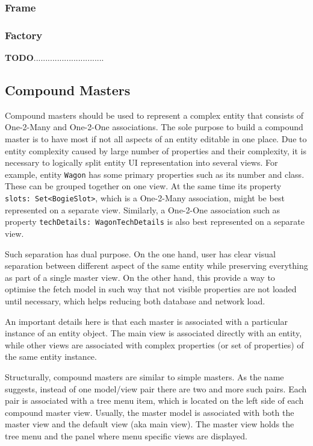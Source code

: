   \subsubsection{Frame}
  
  \subsubsection{Factory}  
  
  
  \textbf{TODO}..............................
  
\subsection{Compound Masters}

  Compound masters should be used to represent a complex entity that consists of One-2-Many and One-2-One associations.
  The sole purpose to build a compound master is to have most if not all aspects of an entity editable in one place.
  Due to entity complexity caused by large number of properties and their complexity, it is necessary to logically split entity UI representation into several views.
  For example, entity \texttt{Wagon} has some primary properties such as its number and class.
  These can be grouped together on one view.
  At the same time its property \texttt{slots: Set<BogieSlot>}, which is a One-2-Many association, might be best represented on a separate view.
  Similarly, a One-2-One association such as property \texttt{techDetails: WagonTechDetails} is also best represented on a separate view.
  
  Such separation has dual purpose.
  On the one hand, user has clear visual separation between different aspect of the same entity while preserving everything as part of a single master view.
  On the other hand, this provide a way to optimise the fetch model in such way that not visible properties are not loaded until necessary, which helps reducing both database and network load.
  
  An important details here is that each master is associated with a particular instance of an entity object.
  The main view is associated directly with an entity, while other views are associated with complex properties (or set of properties) of the same entity instance.
  
  Structurally, compound masters are similar to simple masters.
  As the name suggests, instead of one model/view pair there are two and more such pairs.
  Each pair is associated with a tree menu item, which is located on the left side of each compound master view.
  Usually, the master model is associated with both the master view and the default view (aka main view).
  The master view holds the tree menu and the panel where menu specific views are displayed.
  



